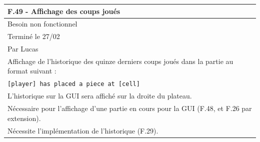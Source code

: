 \documentclass[a4paper,12pt]{article}
\begin{document}
\vspace{1cm}

\noindent
\setlength{\arrayrulewidth}{1.5pt}
\renewcommand{\arraystretch}{1.5}
\begin{tabularx}{\textwidth}{|X|}
    \hline
    \textbf{F.49 - Affichage des coups joués}                                                    \\
    \hline
    Besoin non fonctionnel                                                                       \\
    \hline
    Terminé le 27/02                                                                             \\
    Par Lucas                                                                                    \\
    \hline
    Affichage de l’historique des quinze derniers coups joués dans la partie au format suivant : \\
    \texttt{[player] has placed a piece at [cell]}                                               \\
    L’historique sur la GUI sera affiché sur la droite du plateau.                               \\
    \hline
    Nécessaire pour l’affichage d’une partie en cours pour la GUI (F.48, et F.26 par extension). \\
    Nécessite l’implémentation de l’historique (F.29).                                           \\
    \hline
\end{tabularx}

\vspace{1cm}
\end{document}
